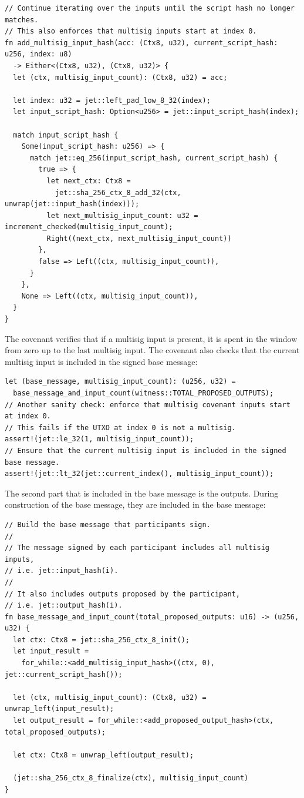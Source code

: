 \documentclass[11pt]{article}
\begin{document}
\begin{lstlisting}
// Continue iterating over the inputs until the script hash no longer matches.
// This also enforces that multisig inputs start at index 0.
fn add_multisig_input_hash(acc: (Ctx8, u32), current_script_hash: u256, index: u8)
  -> Either<(Ctx8, u32), (Ctx8, u32)> {
  let (ctx, multisig_input_count): (Ctx8, u32) = acc;

  let index: u32 = jet::left_pad_low_8_32(index);
  let input_script_hash: Option<u256> = jet::input_script_hash(index);

  match input_script_hash {
    Some(input_script_hash: u256) => {
      match jet::eq_256(input_script_hash, current_script_hash) {
        true => {
          let next_ctx: Ctx8 =
            jet::sha_256_ctx_8_add_32(ctx, unwrap(jet::input_hash(index)));
          let next_multisig_input_count: u32 = increment_checked(multisig_input_count);
          Right((next_ctx, next_multisig_input_count))
        },
        false => Left((ctx, multisig_input_count)),
      }
    },
    None => Left((ctx, multisig_input_count)),
  }
}
\end{lstlisting}

The covenant verifies that if a multisig input is present, it is spent in the window from zero up to the last multisig input.
The covenant also checks that the current multisig input is included in the signed base message:

\begin{lstlisting}
let (base_message, multisig_input_count): (u256, u32) =
  base_message_and_input_count(witness::TOTAL_PROPOSED_OUTPUTS);
// Another sanity check: enforce that multisig covenant inputs start at index 0.
// This fails if the UTXO at index 0 is not a multisig.
assert!(jet::le_32(1, multisig_input_count));
// Ensure that the current multisig input is included in the signed base message.
assert!(jet::lt_32(jet::current_index(), multisig_input_count));
\end{lstlisting}

The second part that is included in the base message is the outputs.
During construction of the base message, they are included in the base message:

\begin{lstlisting}
// Build the base message that participants sign.
//
// The message signed by each participant includes all multisig inputs,
// i.e. jet::input_hash(i).
//
// It also includes outputs proposed by the participant,
// i.e. jet::output_hash(i).
fn base_message_and_input_count(total_proposed_outputs: u16) -> (u256, u32) {
  let ctx: Ctx8 = jet::sha_256_ctx_8_init();
  let input_result =
    for_while::<add_multisig_input_hash>((ctx, 0), jet::current_script_hash());

  let (ctx, multisig_input_count): (Ctx8, u32) = unwrap_left(input_result);
  let output_result = for_while::<add_proposed_output_hash>(ctx, total_proposed_outputs);

  let ctx: Ctx8 = unwrap_left(output_result);

  (jet::sha_256_ctx_8_finalize(ctx), multisig_input_count)
}
\end{lstlisting}
\end{document}
